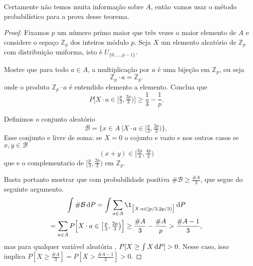 \begin{topics}
Certamente não temos muita informação sobre $A$, então vamos usar o método probabilístico para a prova desse teorema.

\begin{proof}
  Fixamos $p$ um número primo maior que três vezes o maior elemento de $A$ e considere o espaço $\mathbb{Z}_p$ dos inteiros módulo $p$.
  Seja $X$ um elemento aleatório de $\mathbb{Z}_p$ com distribuição uniforma, isto é $U_{\{0, \dots, p-1\}}$.
  \begin{exercise}
    Mostre que para todo $a \in A$, a multiplicação por $a$ é uma bijeção em $\mathbb{Z}_p$, ou seja
    \begin{equation}
      \mathbb{Z}_p \cdot a = \mathbb{Z}_p.
    \end{equation}
    onde o produto $\mathbb{Z}_p \cdot a$ é entendido elemento a elemento.
    Conclua que
    \begin{equation}
      P \Big[ X \cdot a \in \big[\tfrac p3, \tfrac {2p}3\big) \Big] \geq \frac 13 -\frac 1 p.
    \end{equation}
  \end{exercise}
  Definimos o conjunto aleatório
  $$\mathcal{B} = \{ x\in A \ | X\cdot a \in [\tfrac p3, \tfrac {2p}3) \},$$
  Esse conjunto e livre de soma: se $X=0$ o cojunto e vazio e nos outros casos se $x, y\in \mathcal{B}$
  $$(x+y)\in [\tfrac {2p}3, \tfrac {4p} 3)$$
  que e o complementario de $[\tfrac p3, \tfrac {2p}3)$ em $\mathbb{Z}_p$.

  \medskip

  Basta portanto mostrar que com probabilidade positiva $\# \mathcal{B} \geq \tfrac{\#A}3$, que segue do seguinte argumento.
  \begin{multline*}
    \int \# \mathcal{B} \d P = \int \sum_{a \in A} \1_{\big[ X \cdot a \in [p/3, 2p/3) \big]} \d P \\
    =
    \sum_{a \in A} P \Big[ X \cdot a \in \big[\tfrac p3, \tfrac {2p}3\big) \Big] \geq \frac{\# A}3- \frac{\# A} p> \frac{\# A-1 }3,
  \end{multline*}
  mas para qualquer variável aleatória ,  $P[X \geq \int X \mathop{}\!\mathrm{d} P] > 0$.
  Nesse caso, isso implica
  $P[X \ge \frac{\# A}3 ]=  P[X > \frac{\# A-1 }3 ]>0$.
\end{proof}


\end{topics}


